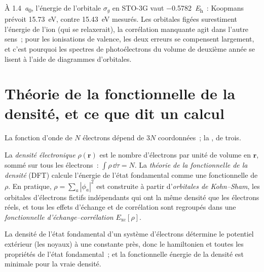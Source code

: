 \begin{example}[Ioniser \ce{H2}]\label{ex:b3:computational-chemistry:koopmans}
À \qty{1.4}{\bohr}, l'énergie de l'orbitale $\sigma_g$ en STO-3G vaut
\qty{-0.5782}{\hartree}~: Koopmans prévoit \qty{15.73}{eV}, contre
\qty{15.43}{eV} mesurés. Les orbitales figées surestiment l'énergie de
l'ion (qui se relaxerait), la corrélation manquante agit dans l'autre
sens~; pour les ionisations de valence, les deux erreurs se compensent
largement, et c'est pourquoi les spectres de photoélectrons du volume de
deuxième année se lisent à l'aide de diagrammes d'orbitales.
\end{example}

\section{Théorie de la fonctionnelle de la densité, et ce que dit un calcul}

La fonction d'onde de $N$ électrons dépend de $3N$ coordonnées~; la
, de trois.

\begin{definition}\label{def:b3:computational-chemistry:dft}
La \emph{densité électronique} $\rho(\mathbf r)$ est le
nombre d'électrons par unité de volume en $\mathbf r$, sommé sur tous les
électrons~:
$\int\rho\,\dd\tau = N$. La \emph{théorie de la fonctionnelle de la densité}
(DFT) calcule l'énergie de l'état fondamental comme une fonctionnelle de
$\rho$. En pratique, $\rho = \sum_a|\phi_a|^2$ est construite à partir
d'\emph{orbitales de Kohn--Sham}, les
orbitales d'électrons fictifs indépendants qui ont la même densité que
les électrons réels, et tous les effets d'échange et de corrélation sont
regroupés dans une \emph{fonctionnelle d'échange--corrélation} $E_{\mathrm{xc}}[\rho]$.
\end{definition}

\begin{theorem}\label{thm:b3:computational-chemistry:hohenberg-kohn}
La densité de l'état fondamental d'un système d'électrons détermine le
potentiel extérieur (les noyaux) à une constante près, donc le
hamiltonien et toutes les propriétés de l'état fondamental~; et la
fonctionnelle énergie de la densité est minimale pour la vraie densité.
\end{theorem}
\admitted

